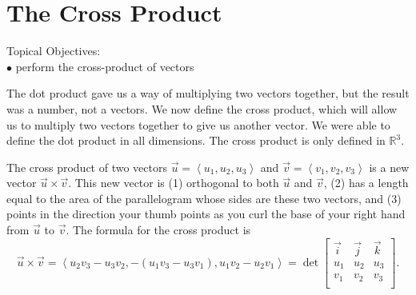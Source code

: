 \fi

\section{The Cross Product}
\large Topical Objectives: \normalsize \\
\indent $\bullet$ perform the cross-product of vectors\\

\vskip0.2in

The dot product gave us a way of multiplying two vectors together, but the result was a number, not a vectors. We now define the cross product, which will allow us to multiply two vectors together to give us another vector.  We were able to define the dot product in all dimensions.  The cross product is only defined in $\mathbb{R}^3$. 

\begin{definition}
The cross product of two vectors $\vec u = \left<u_1,u_2,u_3\right>$ and $\vec v = \left<v_1,v_2,v_3\right>$ is a new vector $\vec u\times \vec v$. This new vector is (1) orthogonal to both $\vec u$ and $\vec v$, (2) has a length equal to the area of the parallelogram whose sides are these two vectors, and (3) points in the direction your thumb points as you curl the base of your right hand from $\vec u$ to $\vec v$. The formula for the cross product is $$\vec u\times \vec v = \left<u_2v_3-u_3v_2,-(u_1v_3-u_3v_1),u_1v_2-u_2v_1\right> = \det\begin{bmatrix}\vec i & \vec j&\vec k\\ u_1&u_2&u_3\\ v_1&v_2&v_3\\\end{bmatrix}.$$
\end{definition}

